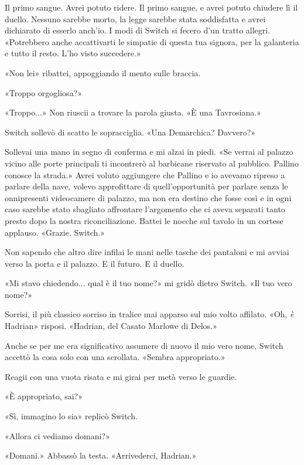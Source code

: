 Il primo sangue. Avrei potuto ridere. Il primo sangue, e avrei potuto
chiudere lì il duello. Nessuno sarebbe morto, la legge sarebbe stata
soddisfatta e avrei dichiarato di esserlo anch'io. I modi di Switch si
fecero d'un tratto allegri. «Potrebbero anche accattivarti le simpatie
di questa tua signora, per la galanteria e tutto il resto. L'ho visto
succedere.»

«Non lei» ribattei, appoggiando il mento sulle braccia.

«Troppo orgogliosa?»

«Troppo...» Non riuscii a trovare la parola giusta. «È una Tavrosiana.»

Switch sollevò di scatto le sopracciglia. «Una Demarchica? Davvero?»

Sollevai una mano in segno di conferma e mi alzai in piedi. «Se verrai
al palazzo vicino alle porte principali ti incontrerò al barbicane
riservato al pubblico. Pallino conosce la strada.» Avrei voluto
aggiungere che Pallino e io avevamo ripreso a parlare della nave, volevo
approfittare di quell'opportunità per parlare senza le onnipresenti
videocamere di palazzo, ma non era destino che fosse così e in ogni caso
sarebbe stato sbagliato affrontare l'argomento che ci aveva separati
tanto presto dopo la nostra riconciliazione. Battei le nocche sul tavolo
in un cortese applauso. «Grazie, Switch.»

Non sapendo che altro dire infilai le mani nelle tasche dei pantaloni e
mi avviai verso la porta e il palazzo. E il futuro. E il duello.

«Mi stavo chiedendo... qual è il tuo nome?» mi gridò dietro Switch. «Il
tuo vero nome?»

Sorrisi, il più classico sorriso in tralice mai apparso sul mio volto
affilato. «Oh, \emph{è} Hadrian» risposi. «Hadrian, del Casato Marlowe
di Delos.»

Anche se per me era significativo assumere di nuovo il mio vero nome,
Switch accettò la cosa solo con una scrollata. «Sembra appropriato.»

Reagii con una vuota risata e mi girai per metà verso le guardie.

«È appropriato, sai?»

«Sì, immagino lo sia» replicò Switch.

«Allora ci vediamo domani?»

«Domani.» Abbassò la testa. «Arrivederci, Hadrian.»


